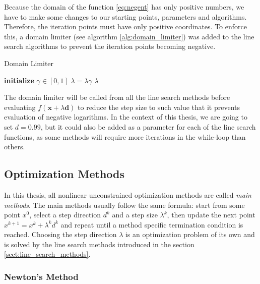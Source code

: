 \documentclass[a4paper,english,titlepage,12pt]{article}
\newcommand{\vect}[1]{\ensuremath{\mathbf{#1}}}
\begin{document}
Because the domain of the function \eqref{eq:negent} has only positive numbers, we have to make some changes to our starting points, parameters and algorithms. Therefore, the iteration points must have only positive coordinates. To enforce this, a domain limiter (see algorithm \ref{alg:domain_limiter}) was added to the line search algorithms to prevent the iteration points becoming negative.

\begin{algorithm}[H]
\caption{Domain Limiter}
\label{alg:domain_limiter}
\begin{algorithmic}[1]
\STATE \textbf{initialize} $\gamma \in [0, 1]$
\WHILE{min $(\vect{x} + \lambda \vect{d}) \leq 0$}
    \STATE $\lambda = \lambda \gamma$
\ENDWHILE
\RETURN $\lambda$
\end{algorithmic}
\end{algorithm}

The domain limiter will be called from all the line search methods before evaluating $f(\vect{x} + \lambda\vect{d})$ to reduce the step size to such value that it prevents evaluation of negative logarithms. In the context of this thesis, we are going to set $d = 0.99$, but it could also be added as a parameter for each of the line search functions, as some methods will require more iterations in the while-loop
than others.


\subsection{Optimization Methods}


In this thesis, all nonlinear unconstrained optimization methods are called \emph{main methods}. The main methods usually follow the same formula: start from some point $x^0$, select a step direction $d^k$ and a step size $\lambda^k$, then update the next point $x^{k + 1} = x^k + \lambda^k d^k$ and repeat until a method specific termination condition is reached. Choosing the step direction $\lambda$ is an optimization problem of its own and is solved by the line search methods introduced in the section \ref{sect:line_search_methods}. \cite{book:nonlinear_programming}


\subsubsection{Newton's Method}
\end{document}
